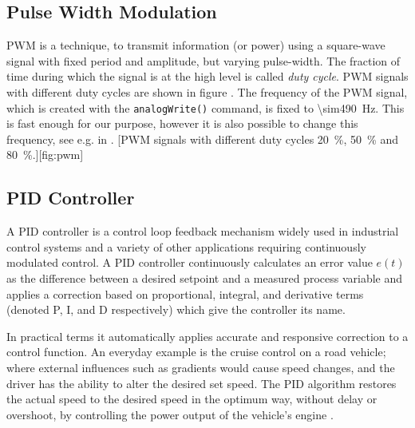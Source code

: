 \subsection{Pulse Width Modulation}
\ac{PWM} is a technique, to transmit information (or power) using a square-wave signal with fixed period and amplitude, but varying pulse-width. The fraction of time during which the signal is at the high level is called \textit{duty cycle}. \ac{PWM} signals with different duty cycles are shown in figure . The frequency of the \ac{PWM} signal, which is created with the \texttt{analogWrite()} command, is fixed to \SI{\sim490}{\Hz}. This is fast enough for our purpose, however it is also possible to change this frequency, see e.g. in \cite{avrguide}.
%
[\ac{PWM} signals with different duty cycles \SI{20}{\percent}, \SI{50}{\percent} and \SI{80}{\percent}.][fig:pwm]
%
\subsection{PID Controller}\label{sec:pid}
A \ac{PID} controller is a control loop feedback mechanism widely used in industrial control systems and a variety of other applications requiring continuously modulated control. A \ac{PID} controller continuously calculates an error value $e(t)$ as the difference between a desired setpoint and a measured process variable and applies a correction based on proportional, integral, and derivative terms (denoted P, I, and D respectively) which give the controller its name.\par
%
In practical terms it automatically applies accurate and responsive correction to a control function. An everyday example is the cruise control on a road vehicle; where external influences such as gradients would cause speed changes, and the driver has the ability to alter the desired set speed. The \ac{PID} algorithm restores the actual speed to the desired speed in the optimum way, without delay or overshoot, by controlling the power output of the vehicle's engine \cite{wiki:pid}.



